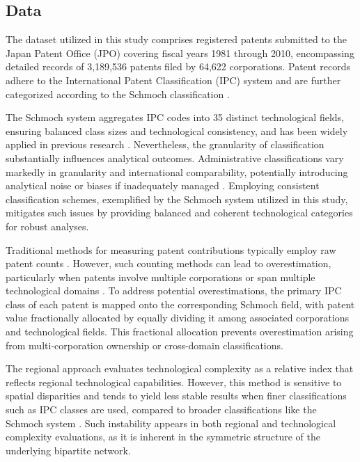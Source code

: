 \subsection*{Data}
{}
\label{subsection:Data}

The dataset utilized in this study comprises registered patents submitted to the Japan Patent Office (JPO) covering fiscal years 1981 through 2010, encompassing detailed records of 3,189,536 patents filed by 64,622 corporations. Patent records adhere to the International Patent Classification (IPC) system and are further categorized according to the Schmoch classification \cite{Schmoch2008}.

The Schmoch system aggregates IPC codes into 35 distinct technological fields, ensuring balanced class sizes and technological consistency, and has been widely applied in previous research \cite{PintarScherngell2022,Balland2018,Whittle2019}. Nevertheless, the granularity of classification substantially influences analytical outcomes. Administrative classifications vary markedly in granularity and international comparability, potentially introducing analytical noise or biases if inadequately managed \cite{Hidalgo2021}. Employing consistent classification schemes, exemplified by the Schmoch system utilized in this study, mitigates such issues by providing balanced and coherent technological categories for robust analyses.

Traditional methods for measuring patent contributions typically employ raw patent counts \cite{Balland2016,Balland2018,PintarScherngell2022,Pinheiro2022,Whittle2019,Jun2023,Abay2024}. However, such counting methods can lead to overestimation, particularly when patents involve multiple corporations or span multiple technological domains \cite{PintarScherngell2022}. To address potential overestimations, the primary IPC class of each patent is mapped onto the corresponding Schmoch field, with patent value fractionally allocated by equally dividing it among associated corporations and technological fields. This fractional allocation prevents overestimation arising from multi-corporation ownership or cross-domain classifications.

The regional approach evaluates technological complexity as a relative index that reflects regional technological capabilities.
However, this method is sensitive to spatial disparities and tends to yield less stable results when finer classifications such as IPC classes are used, compared to broader classifications like the Schmoch system \cite{PintarEssletzbichler2022}.
Such instability appears in both regional and technological complexity evaluations, as it is inherent in the symmetric structure of the underlying bipartite network.

